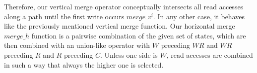 Therefore, our vertical merge operator conceptually intersects all read accesses along a path until the first write 
occurs $merge\_v^{i}$. In any other case, it behaves like the previously mentioned vertical merge function.
Our horizontal merge $merge\_h$ function is a pairwise combination of the given set of states, which are then combined with an union-like operator 
with $W$ preceding $WR$ and $WR$ preceding $R$ and $R$ preceding $C$. Unless one side is $W$, read accesses are combined in such a way that always the higher one is selected.

%

